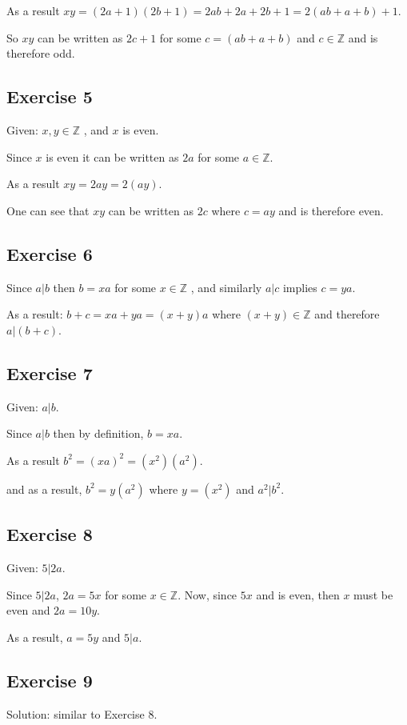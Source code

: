 \documentclass[a4paper]{article}
\begin{document}
As a result $xy = (2a+1)(2b+1) = 2ab + 2a + 2b + 1 = 2(ab+a+b)+1$.

So $xy$ can be written as $2c+1$ for some $c=(ab+a+b)$ and $c \in \mathbb{Z}$
and is therefore odd.

\subsection{Exercise 5}

Given: $ x, y \in \mathbb{Z} $ , and $x$ is even.

Since $x$ is even it can be written as $2a$ for some $a \in \mathbb{Z}$.

As a result $xy = 2ay = 2(ay)$.

One can see that $xy$ can be written as $2c$ where $c = ay$ and is therefore
even.

\subsection{Exercise 6}

Since $a | b$ then $b = xa$ for some $x \in \mathbb{Z}$ , and similarly $a | c$
implies $c = ya$.

As a result: $b+c = xa + ya = (x+y)a$ where $ (x+y) \in \mathbb{Z}$ and
therefore $a|(b+c)$.

\subsection{Exercise 7}

Given: $a | b$.

Since $a | b$ then by definition, $b = xa$.

As a result $b^2 = (xa)^2 = (x^2)(a^2)$.

and as a result, $b^2 = y(a^2)$ where $y=(x^2)$ and $a^2|b^2$.

\subsection{Exercise 8}

Given: $5 | 2a$.

Since $5 | 2a$, $2a = 5x$ for some $x \in \mathbb{Z} $. Now, since $5x$
and is even, then $x$ must be even and $2a = 10y$.

As a result, $a = 5y$ and $5 | a$.

\subsection{Exercise 9}

Solution: similar to Exercise 8.
\end{document}
